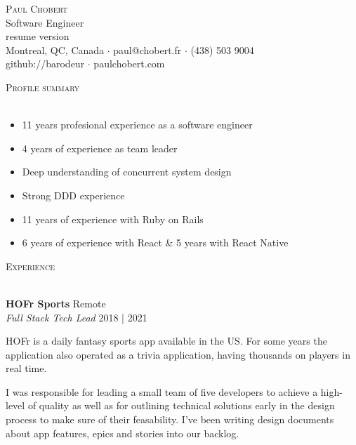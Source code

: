 \documentclass[a4paper]{article}
\newcommand{\lineunder} {
    \vspace*{-8pt} \\
    \hspace*{-18pt} \hrulefill \\
}
\newcommand{\header} [1] {
    {\hspace*{-18pt}\vspace*{6pt} \textsc{#1}}
    \vspace*{-6pt} \lineunder
}
\begin{document}
\vspace*{-40pt}

\vspace*{-10pt}
\begin{center}
    {\Huge \scshape {Paul Chobert}}\\
    Software Engineer\\
    \ifx\empty\gitsha
    \else
        {\small resume version \href{https://github.com/barodeur/resume/tree/\gitsha}{}}\\
    \fi
    Montreal, QC, Canada $\cdot$ paul@chobert.fr $\cdot$ (438) 503 9004\\
    github://barodeur $\cdot$ paulchobert.com
\end{center}

\vspace*{2mm}

\header{Profile summary}
\vspace{1mm}

\vspace{-1mm}
\begin{itemize} \itemsep 1pt
    \item 11 years profesional experience as a software engineer
    \item 4 years of experience as team leader
    \item Deep understanding of concurrent system design
    \item Strong DDD experience
    \item 11 years of experience with Ruby on Rails
    \item 6 years of experience with React \& 5 years with React Native
\end{itemize}
\vspace{-1mm}

\header{Experience}
\vspace{1mm}

\textbf{HOFr Sports} \hfill Remote\\
\textit{Full Stack Tech Lead} \hfill 2018 | 2021\\
\vspace{2mm}

HOFr is a daily fantasy sports app available in the US. For some years the application also operated as
a trivia application, having thousands on players in real time.

I was responsible for leading a small team of five developers to achieve a high-level of quality as well as
for outlining technical solutions early in the design process to make sure of their feasability.
I've been writing design documents about app features, epics and stories into our backlog.
\end{document}
